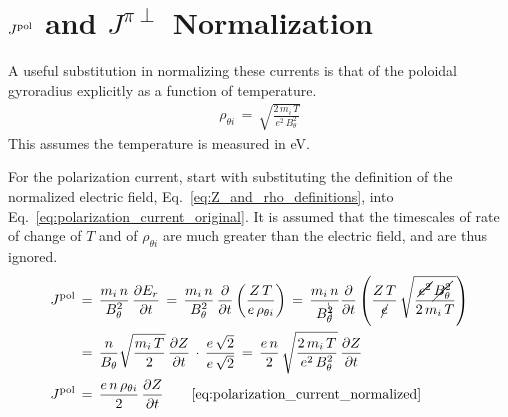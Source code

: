 \chapter{\texorpdfstring{$J^\textnormal{pol}$}{J pol} and \texorpdfstring{$J^{\pi\perp}$}{J bulk} Normalization}\label{chapter:Normalization}
A useful substitution in normalizing these currents is that of the poloidal gyroradius explicitly as a function of temperature.
\begin{align} %
	\rho_{\theta i} \,=\, \sqrt{\frac{2 \, m_i \, T}{e^2 \, B_\theta^2}}
\end{align}
This assumes the temperature is measured in eV.

For the polarization current, start with substituting the definition of the normalized electric field, Eq.~\ref{eq:Z_and_rho_definitions}, into Eq.~\ref{eq:polarization_current_original}.
It is assumed that the timescales of rate of change of $T$ and of $\rho_{\theta i}$ are much greater than the electric field, and are thus ignored.
\begin{align} %
	J^\text{pol} \,&=\, \frac{m_i\,n}{B_\theta^2}\, \frac{\partial E_r}{\partial t}
		\,=\, \frac{m_i \, n}{B_\theta^2} \, \frac{\partial}{\partial t}
		\left(\frac{Z \, T}{e \, \rho_{\theta i}}\right)
		\,=\, \frac{m_i \, n}{B_\theta^{\bcancel{2}}} \frac{\partial}{\partial t}
		\left(\frac{Z \, T}{\cancel{e}} \, \sqrt{\frac{\cancel{e^2} \,
		\cancel{B_\theta^2}}{2 \, m_i \, T}} \right) \\
	&=\, \frac{n}{B_\theta} \sqrt{\frac{m_i \, T}{2}} \,
		\frac{\partial Z}{\partial t} \,\cdot\, \frac{e\,\sqrt{2}}{e\,\sqrt{2}}
		\,=\, \frac{e\,n}{2} \, \sqrt{\frac{2 \, m_i \, T}{e^2 \, B_\theta^2}}
		\, \frac{\partial Z}{\partial t} \\
	J^\text{pol} \,&=\, \frac{e \, n \, \rho_{\theta i}}{2} \,
		\frac{\partial Z}{\partial t}
		\tag*{\eqref{eq:polarization_current_normalized}}
\end{align}

